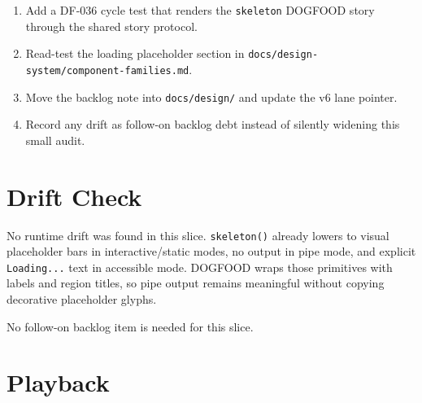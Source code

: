 \begin{enumerate}
\def\labelenumi{\arabic{enumi}.}
\tightlist
\item
  Add a DF-036 cycle test that renders the \texttt{s\allowbreak{}k\allowbreak{}e\allowbreak{}l\allowbreak{}e\allowbreak{}t\allowbreak{}o\allowbreak{}n} DOGFOOD story through the shared story protocol.
\item
  Read-test the loading placeholder section in \texttt{d\allowbreak{}o\allowbreak{}c\allowbreak{}s\allowbreak{}/\allowbreak{}d\allowbreak{}e\allowbreak{}s\allowbreak{}i\allowbreak{}g\allowbreak{}n\allowbreak{}-\allowbreak{}s\allowbreak{}y\allowbreak{}s\allowbreak{}t\allowbreak{}e\allowbreak{}m\allowbreak{}/\allowbreak{}c\allowbreak{}o\allowbreak{}m\allowbreak{}p\allowbreak{}o\allowbreak{}n\allowbreak{}e\allowbreak{}n\allowbreak{}t\allowbreak{}-\allowbreak{}f\allowbreak{}a\allowbreak{}m\allowbreak{}i\allowbreak{}l\allowbreak{}i\allowbreak{}e\allowbreak{}s\allowbreak{}.\allowbreak{}m\allowbreak{}d}.
\item
  Move the backlog note into \texttt{d\allowbreak{}o\allowbreak{}c\allowbreak{}s\allowbreak{}/\allowbreak{}d\allowbreak{}e\allowbreak{}s\allowbreak{}i\allowbreak{}g\allowbreak{}n\allowbreak{}/} and update the v6 lane pointer.
\item
  Record any drift as follow-on backlog debt instead of silently widening this small audit.
\end{enumerate}

\section{Drift Check}\label{record-093-drift-check}

No runtime drift was found in this slice. \texttt{s\allowbreak{}k\allowbreak{}e\allowbreak{}l\allowbreak{}e\allowbreak{}t\allowbreak{}o\allowbreak{}n\allowbreak{}(\allowbreak{})} already lowers to visual placeholder bars in interactive/static modes, no output in pipe mode, and explicit \texttt{L\allowbreak{}o\allowbreak{}a\allowbreak{}d\allowbreak{}i\allowbreak{}n\allowbreak{}g\allowbreak{}.\allowbreak{}.\allowbreak{}.} text in accessible mode. DOGFOOD wraps those primitives with labels and region titles, so pipe output remains meaningful without copying decorative placeholder glyphs.

No follow-on backlog item is needed for this slice.

\section{Playback}\label{record-093-playback}

